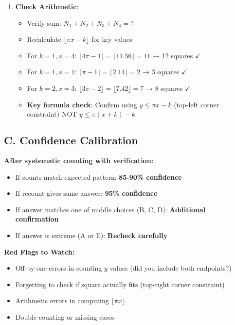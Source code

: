 \documentclass[12pt]{article}
\begin{document}
\begin{verificationbox}
\begin{enumerate}
    \item \textbf{Check Arithmetic}:
    \begin{itemize}
        \item Verify sum: $N_1 + N_2 + N_3 + N_4 = ?$
        \item Recalculate $\lfloor \pi x - k \rfloor$ for key values
        \item For $k=1, x=4$: $\lfloor 4\pi - 1 \rfloor = \lfloor 11.56 \rfloor = 11$ → 12 squares $\checkmark$
        \item For $k=1, x=1$: $\lfloor \pi - 1 \rfloor = \lfloor 2.14 \rfloor = 2$ → 3 squares $\checkmark$
        \item For $k=2, x=3$: $\lfloor 3\pi - 2 \rfloor = \lfloor 7.42 \rfloor = 7$ → 8 squares $\checkmark$
        \item \textbf{Key formula check}: Confirm using $y \leq \pi x - k$ (top-left corner constraint) NOT $y \leq \pi(x+k) - k$
    \end{itemize}
\end{enumerate}

\subsection*{C. Confidence Calibration}

\textbf{After systematic counting with verification:}
\begin{itemize}
    \item If counts match expected pattern: \textbf{85-90\% confidence}
    \item If recount gives same answer: \textbf{95\% confidence}
    \item If answer matches one of middle choices (B, C, D): \textbf{Additional confirmation}
    \item If answer is extreme (A or E): \textbf{Recheck carefully}
\end{itemize}

\textbf{Red Flags to Watch:}
\begin{itemize}
    \item Off-by-one errors in counting $y$ values (did you include both endpoints?)
    \item Forgetting to check if square actually fits (top-right corner constraint)
    \item Arithmetic errors in computing $\lfloor \pi x \rfloor$
    \item Double-counting or missing cases
\end{itemize}
\end{verificationbox}
\end{document}
